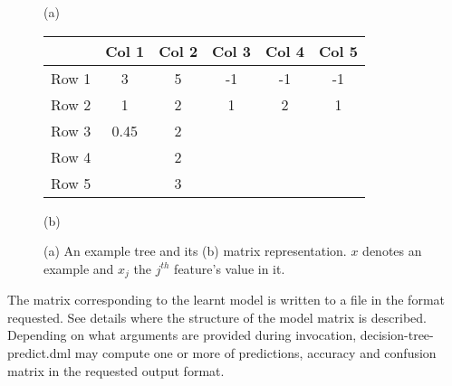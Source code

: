 \begin{figure}
\begin{minipage}{0.3\linewidth}
\begin{center}
\end{center}
\begin{center}
(a)
\end{center}
\end{minipage}
\hfill
\begin{minipage}{0.65\linewidth}
\begin{center}
\begin{tabular}{c|c|c|c|c|c|}
& Col 1 & Col 2 & Col 3 & Col 4 & Col 5\\
\hline
Row 1 & 3 & 5 & -1 & -1 & -1\\
\hline
Row 2 & 1 & 2 & 1 & 2 & 1\\
\hline
Row 3 & 0.45 & 2 &  &  & \\
\hline
Row 4 &  & 2 &  &  & \\
\hline
Row 5 &  & 3 &  &  & \\
\hline
\end{tabular}
\end{center}
\begin{center}
(b)
\end{center}
\end{minipage}
\caption{(a) An example tree and its (b) matrix representation. $x$ denotes an example and $x_j$ the $j^{th}$ feature's value in it.}
\label{dtree}
\end{figure}

\vspace{16pt}


The matrix corresponding to the learnt model is written to a file in the format requested. See
details where the structure of the model matrix is
described. Depending on what arguments are provided during
invocation, decision-tree-predict.dml may compute one or more of
predictions,  accuracy and confusion matrix in the requested output format.
\\


